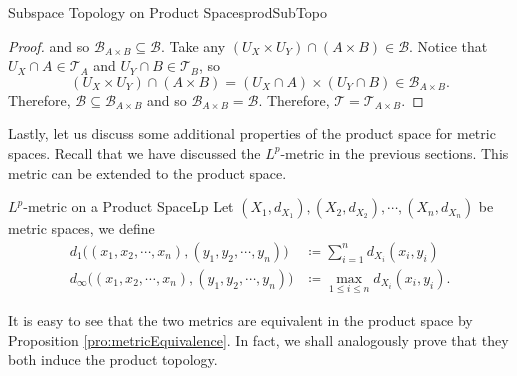 \documentclass[math]{amznotes}
\theoremstyle{remark}
\begin{document}
\begin{probox}{Subspace Topology on Product Spaces}{prodSubTopo}
\begin{proof}
        and so $\mathcal{B}_{A \times B} \subseteq \mathcal{B}$. Take any $\left(U_X \times U_Y\right) \cap \left(A \times B\right) \in \mathcal{B}$. Notice that $U_X \cap A \in \mathcal{T}_A$ and $U_Y \cap B \in \mathcal{T}_B$, so 
        \begin{equation*}
            \left(U_X \times U_Y\right) \cap \left(A \times B\right) = \left(U_X \cap A\right) \times \left(U_Y \cap B\right) \in \mathcal{B}_{A \times B}.
        \end{equation*}
        Therefore, $\mathcal{B} \subseteq \mathcal{B}_{A \times B}$ and so $\mathcal{B}_{A \times B} = \mathcal{B}$. Therefore, $\mathcal{T} = \mathcal{T}_{A \times B}$.
    \end{proof}
\end{probox}
Lastly, let us discuss some additional properties of the product space for metric spaces. Recall that we have discussed the $L^p$-metric in the previous sections. This metric can be extended to the product space.
\begin{dfnbox}{$L^p$-metric on a Product Space}{Lp}
    Let $\left(X_1, d_{X_1}\right), \left(X_2, d_{X_2}\right), \cdots, \left(X_n, d_{X_n}\right)$ be metric spaces, we define 
    \begin{align*}
        d_1\bigl(\left(x_1, x_2, \cdots, x_n\right), \left(y_1, y_2, \cdots, y_n\right)\bigr) & \coloneqq \sum_{i = 1}^{n}d_{X_i}\left(x_i, y_i\right) \\
        d_{\infty}\bigl(\left(x_1, x_2, \cdots, x_n\right), \left(y_1, y_2, \cdots, y_n\right)\bigr) & \coloneqq \max_{1 \leq i \leq n}d_{X_i}\left(x_i, y_i\right).
    \end{align*}
\end{dfnbox}
It is easy to see that the two metrics are equivalent in the product space by Proposition \ref{pro:metricEquivalence}. In fact, we shall analogously prove that they both induce the product topology.
\end{document}
